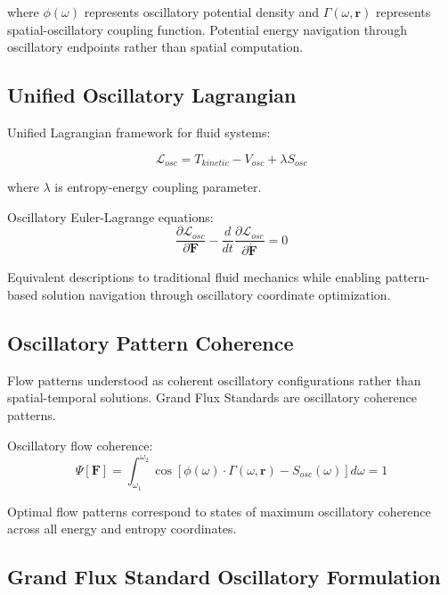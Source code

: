 \documentclass[12pt,a4paper]{article}
\begin{document}
where $\phi(\omega)$ represents oscillatory potential density and $\Gamma(\omega, \mathbf{r})$ represents spatial-oscillatory coupling function. Potential energy navigation through oscillatory endpoints rather than spatial computation.

\subsection{Unified Oscillatory Lagrangian}

Unified Lagrangian framework for fluid systems:

\begin{equation}
\mathcal{L}_{osc} = T_{kinetic} - V_{osc} + \lambda S_{osc}
\end{equation}

where $\lambda$ is entropy-energy coupling parameter.

Oscillatory Euler-Lagrange equations:
\begin{equation}
\frac{\partial \mathcal{L}_{osc}}{\partial \mathbf{F}} - \frac{d}{dt}\frac{\partial \mathcal{L}_{osc}}{\partial \dot{\mathbf{F}}} = 0
\end{equation}

Equivalent descriptions to traditional fluid mechanics while enabling pattern-based solution navigation through oscillatory coordinate optimization.

\subsection{Oscillatory Pattern Coherence}

Flow patterns understood as coherent oscillatory configurations rather than spatial-temporal solutions. Grand Flux Standards are oscillatory coherence patterns.

Oscillatory flow coherence:
\begin{equation}
\Psi[\mathbf{F}] = \int_{\omega_1}^{\omega_2} \cos[\phi(\omega) \cdot \Gamma(\omega, \mathbf{r}) - S_{osc}(\omega)] d\omega = 1
\end{equation}

Optimal flow patterns correspond to states of maximum oscillatory coherence across all energy and entropy coordinates.

\subsection{Grand Flux Standard Oscillatory Formulation}
\end{document}
